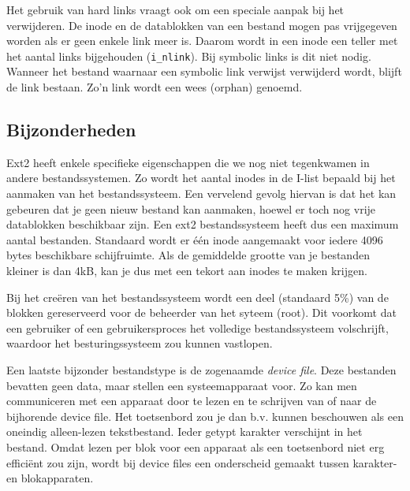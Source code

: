 Het gebruik van hard links vraagt ook om een speciale aanpak bij het verwijderen. De inode en de datablokken van
een bestand mogen pas vrijgegeven worden als er geen enkele link meer is. Daarom wordt in een inode een teller
met het aantal links bijgehouden (\verb|i_nlink|). Bij symbolic links is dit niet nodig. Wanneer het bestand
waarnaar een symbolic link verwijst verwijderd wordt, blijft de link bestaan. Zo'n link wordt een wees (orphan)
genoemd.

\subsection{Bijzonderheden}

Ext2 heeft enkele specifieke eigenschappen die we nog niet tegenkwamen in andere bestandssystemen. Zo wordt
het aantal inodes in de I-list bepaald bij het aanmaken van het bestandssysteem. Een vervelend
gevolg hiervan is dat het kan gebeuren dat je geen nieuw bestand kan aanmaken, hoewel er toch nog vrije
datablokken beschikbaar zijn. Een ext2 bestandssysteem heeft dus een maximum aantal bestanden. Standaard
wordt er \'e\'en inode aangemaakt voor iedere 4096 bytes beschikbare schijfruimte. Als de gemiddelde grootte
van je bestanden kleiner is dan 4kB, kan je dus met een tekort aan inodes te maken krijgen.

Bij het cre\"eren van het bestandssysteem wordt een deel (standaard 5\%) van de blokken gereserveerd voor
de beheerder van het syteem (root). Dit voorkomt dat een gebruiker of een gebruikersproces het volledige
bestandssysteem volschrijft, waardoor het besturingssysteem zou kunnen vastlopen.

Een laatste bijzonder bestandstype is de zogenaamde \emph{device file}. Deze bestanden bevatten geen data, maar
stellen een systeemapparaat voor. Zo kan men communiceren met een apparaat door te lezen en te schrijven van of
naar de bijhorende device file. Het toetsenbord zou je dan b.v. kunnen beschouwen als een oneindig alleen-lezen
tekstbestand. Ieder getypt karakter verschijnt in het bestand. Omdat lezen per blok voor een apparaat als een
toetsenbord niet erg effici\"ent zou zijn, wordt bij device files een onderscheid gemaakt tussen karakter- en
blokapparaten.
